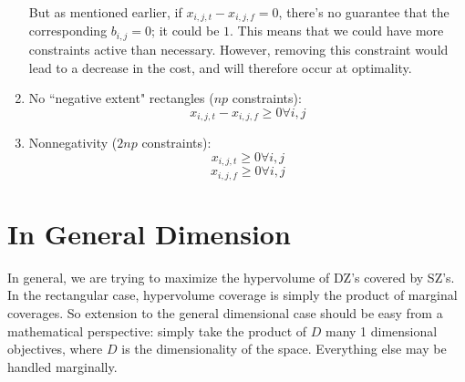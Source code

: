 \documentclass[a4paper]{article}
\begin{document}
\begin{enumerate}
        But as mentioned earlier, if $x_{i,j,t} - x_{i,j,f} = 0$, there's no guarantee that the corresponding $b_{i,j} = 0$; it could be $1$. This means that we could have more constraints active than necessary. However, removing this constraint would lead to a decrease in the cost, and will therefore occur at optimality.


    \item No ``negative extent" rectangles ($np$ constraints):
        $$x_{i,j,t} - x_{i,j,f} \geq 0 \forall i,j$$
    \item Nonnegativity ($2np$ constraints):
        $$x_{i,j,t} \geq 0 \forall i,j$$
        $$x_{i,j,f} \geq 0 \forall i,j$$
\end{enumerate}

\section{In General Dimension}

In general, we are trying to maximize the hypervolume of DZ's covered by SZ's. In the rectangular case, hypervolume coverage is simply the product of marginal coverages. So extension to the general dimensional case should be easy from a mathematical perspective: simply take the product of $D$ many 1 dimensional objectives, where $D$ is the dimensionality of the space. Everything else may be handled marginally.
\end{document}

